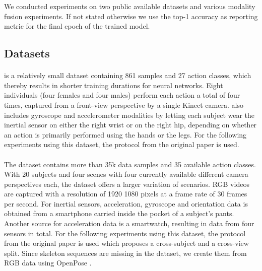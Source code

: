 We conducted experiments on two public available datasets and various modality fusion experiments. 
If not stated otherwise we use the top-1 accuracy as reporting metric for the final epoch of the trained model.

\subsection{Datasets}

\paragraph{\utdmhad} 

\utdmhad{} \cite{DBLP:conf/icip/ChenJK15} is a relatively small dataset containing 861 samples and 27 action classes, which thereby results in shorter training durations for neural networks. Eight individuals (four females and four males) perform each action a total of four times, captured from a front-view perspective by a single Kinect camera. 
\utdmhad{} also includes gyroscope and accelerometer modalities by letting each subject wear the inertial sensor on either the right wrist or on the right hip, depending on whether an action is primarily performed using the hands or the legs. 
For the following experiments using this dataset, the protocol from the original paper \cite{DBLP:conf/icip/ChenJK15} is used.

\paragraph{\mmact}
The \mmact{} dataset \cite{DBLP:conf/iccv/KongWDKTM19} contains more than 35k data samples and
35 available action classes. With 20 subjects and four scenes with four currently available different camera perspectives each, the dataset offers a larger variation of scenarios.
RGB videos are captured with a resolution of 1920  1080 pixels at a frame rate of 30 frames per second. 
For inertial sensors, acceleration, gyroscope and orientation data is obtained from a smartphone carried inside the pocket of a subject's pants. Another source for acceleration data is a smartwatch, resulting in data from four sensors in total. For the following experiments using this dataset, the protocol from the original paper \cite{DBLP:conf/iccv/KongWDKTM19} is used which proposes a cross-subject and a cross-view split. Since skeleton sequences are missing in the dataset, we create them from RGB data using OpenPose \cite{DBLP:journals/pami/CaoHSWS21}.

